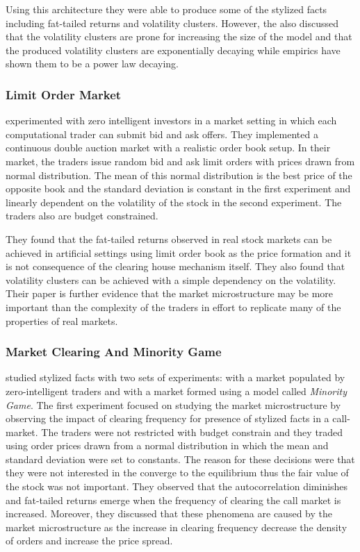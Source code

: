 Using this architecture they were able to produce some of the stylized facts
including fat-tailed returns and volatility clusters. However, the also discussed
that the volatility clusters are prone for increasing the size of the model and
that the produced volatility clusters are exponentially decaying while empirics have
shown them to be a power law decaying.

\subsubsection{Limit Order Market}
\citet{Raberto05} experimented with zero intelligent investors in a market setting
in which each computational trader can submit bid and ask offers. They
implemented a continuous double auction market with a realistic order
book setup. In their market, the traders issue random bid and ask limit
orders with prices drawn from normal distribution. The mean of this 
normal distribution is the best price of the opposite book and the 
standard deviation is constant in the first experiment and linearly 
dependent on the volatility of the stock in the second experiment. The
traders also are budget constrained. 

They found that the fat-tailed returns observed in
real stock markets can be achieved in artificial settings using limit 
order book as the price formation and it is not consequence of the clearing 
house mechanism itself. They also found that volatility clusters can
be achieved with a simple dependency on the volatility. Their paper
is further evidence that the market microstructure may be more
important than the complexity of the traders in effort to replicate
many of the properties of real markets.

\subsubsection{Market Clearing And Minority Game}

\citet{LIU20082535} studied stylized facts with two sets of experiments: with
a market populated by zero-intelligent traders and with a market formed using 
a model called \textit{Minority Game}. The first experiment focused on studying
the market microstructure by observing the impact of clearing frequency for 
presence of stylized facts in a call-market. The traders were not restricted with budget 
constrain and they traded using order prices drawn from a normal distribution 
in which the mean and standard deviation were set to constants. The reason 
for these decisions were that they were not interested in the converge to 
the equilibrium thus the fair value of the stock was not important. They 
observed that the autocorrelation diminishes and fat-tailed returns emerge 
when the frequency of clearing the call market is increased. Moreover,
they discussed that these phenomena are caused by the market microstructure
as the increase in clearing frequency decrease the density of orders and 
increase the price spread.

